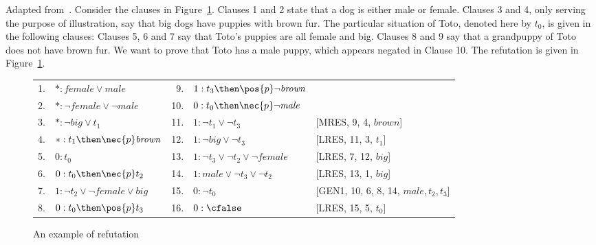 \begin{example}
    Adapted from~\cite{Areces:1999:PRR,nalon2015modal}. Consider the clauses in
    Figure~\ref{tab:calcunsat}. Clauses 1 and 2 state that a dog is either
    male or female. Clauses 3 and 4, only serving the purpose of illustration,
    say that big dogs have puppies with brown fur. The particular situation
    of Toto, denoted here by $t_0$, is given in the following clauses: Clauses
    5, 6 and 7 say that Toto's puppies are all female and big. Clauses 8 and 9
    say that a grandpuppy of Toto does not have brown fur. We want to prove that
    Toto has a male puppy, which appears negated in Clause 10. The refutation is
    given in Figure~\ref{tab:calcunsat}. 

    \begin{figure}[h!]%
        \centering%
        \begin{tabular}{rlrll}
            1.&$* : \mathit{female} \lor \mathit{male}$           & 9. &$1 : t_3 \then \pos{p} \neg \mathit{brown}$            & \\
            2.&$* : \neg \mathit{female} \lor \neg \mathit{male}$ & 10.&$0 : t_0 \then \nec{p} \neg \mathit{male}$             & \\ 
            3.&$* : \neg \mathit{big} \lor t_1$                   & 11.&$1 : \neg t_1 \lor \neg t_3$                           & [MRES, 9, 4, $\mathit{brown}$]\\
            4.&$* : t_1 \then \nec{p} \mathit{brown}$             & 12.&$1 : \neg \mathit{big} \lor \neg t_3$                  & [LRES, 11, 3, $t_1$]\\
            5.&$0 : t_0$                                          & 13.&$1 : \neg t_3 \lor \neg t_2 \lor \neg \mathit{female}$ & [LRES, 7, 12, $\mathit{big}$]\\
            6.&$0 : t_0 \then \nec{p} t_2$                        & 14.&$1 : \mathit{male} \lor \neg t_3 \lor \neg t_2$        & [LRES, 13, 1, $\mathit{big}$]\\
            7.&$1 : \neg t_2 \lor \neg \mathit{female} \lor \mathit{big}$ & 15.&$0 : \neg t_0$ & [GEN1, 10, 6, 8, 14, $\mathit{male},t_2,t_3$]\\
            8.&$0 : t_0 \then \pos{p} t_3$                        & 16.&$0 : \cfalse$ & [LRES, 15, 5, $t_0$]\\
       \end{tabular}%
        \caption{An example of refutation}%
        \label{tab:calcunsat}
    \end{figure}
\end{example}

